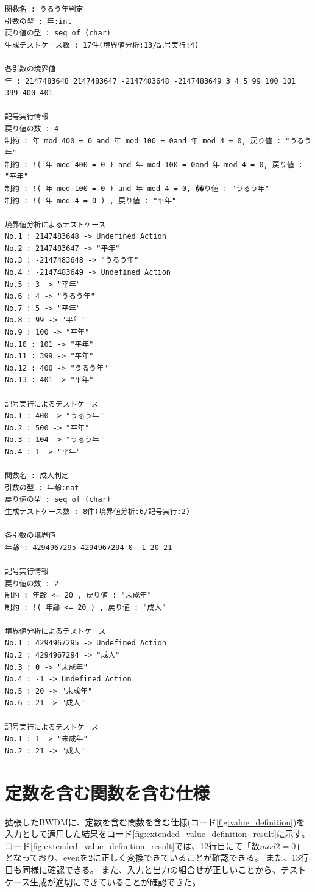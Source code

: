 \documentclass[uplatex, report, a4j, 10pt]{jsbook}
\begin{document}
\lstset{language=}
\noindent\begin{minipage}{\textwidth}
  \begin{lstlisting}[caption=拡張したBWDMにコード\ref{fig:func_multiple}を適用した際の出力,label=fig:extended_func_multiple_result]
関数名 : うるう年判定
引数の型 : 年:int 
戻り値の型 : seq of (char)
生成テストケース数 : 17件(境界値分析:13/記号実行:4)

各引数の境界値
年 : 2147483648 2147483647 -2147483648 -2147483649 3 4 5 99 100 101 399 400 401 

記号実行情報
戻り値の数 : 4
制約 : 年 mod 400 = 0 and 年 mod 100 = 0and 年 mod 4 = 0, 戻り値 : "うるう年"
制約 : !( 年 mod 400 = 0 ) and 年 mod 100 = 0and 年 mod 4 = 0, 戻り値 : "平年"
制約 : !( 年 mod 100 = 0 ) and 年 mod 4 = 0, ��り値 : "うるう年"
制約 : !( 年 mod 4 = 0 ) , 戻り値 : "平年"

境界値分析によるテストケース
No.1 : 2147483648 -> Undefined Action
No.2 : 2147483647 -> "平年"
No.3 : -2147483648 -> "うるう年"
No.4 : -2147483649 -> Undefined Action
No.5 : 3 -> "平年"
No.6 : 4 -> "うるう年"
No.7 : 5 -> "平年"
No.8 : 99 -> "平年"
No.9 : 100 -> "平年"
No.10 : 101 -> "平年"
No.11 : 399 -> "平年"
No.12 : 400 -> "うるう年"
No.13 : 401 -> "平年"

記号実行によるテストケース
No.1 : 400 -> "うるう年"
No.2 : 500 -> "平年"
No.3 : 104 -> "うるう年"
No.4 : 1 -> "平年"

関数名 : 成人判定
引数の型 : 年齢:nat 
戻り値の型 : seq of (char)
生成テストケース数 : 8件(境界値分析:6/記号実行:2)

各引数の境界値
年齢 : 4294967295 4294967294 0 -1 20 21 

記号実行情報
戻り値の数 : 2
制約 : 年齢 <= 20 , 戻り値 : "未成年"
制約 : !( 年齢 <= 20 ) , 戻り値 : "成人"

境界値分析によるテストケース
No.1 : 4294967295 -> Undefined Action
No.2 : 4294967294 -> "成人"
No.3 : 0 -> "未成年"
No.4 : -1 -> Undefined Action
No.5 : 20 -> "未成年"
No.6 : 21 -> "成人"

記号実行によるテストケース
No.1 : 1 -> "未成年"
No.2 : 21 -> "成人"

\end{lstlisting}
\end{minipage}

\section{定数を含む関数を含む仕様}
拡張したBWDMに、定数を含む関数を含む仕様(コード\ref{fig:value_definition})を入力として適用した結果をコード\ref{fig:extended_value_definition_result}に示す。
コード\ref{fig:extended_value_definition_result}では、12行目にて「$数 mod 2 = 0$」となっており、evenを2に正しく変換できていることが確認できる。
また、13行目も同様に確認できる。
また、入力と出力の組合せが正しいことから、テストケース生成が適切にできていることが確認できた。
\end{document}
